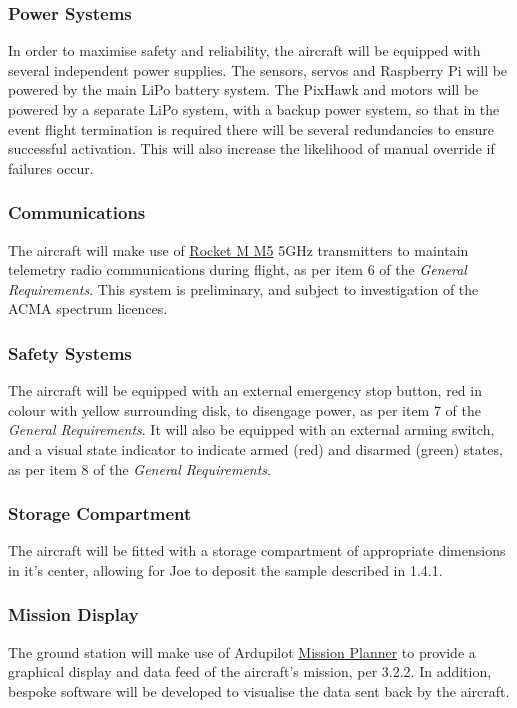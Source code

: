 \subsubsection*{Power Systems}
In order to maximise safety and reliability, the aircraft will be equipped with several independent power supplies. The sensors, servos and Raspberry Pi will be powered by the main LiPo battery system. The PixHawk and motors will be powered by a separate LiPo system, with a backup power system, so that in the event flight termination is required there will be several redundancies to ensure successful activation. This will also increase the likelihood of manual override if failures occur.

\subsubsection*{Communications}
The aircraft will make use of \href{https://www.ubnt.com/airmax/rocketm/}{Rocket M M5}  5GHz transmitters to maintain telemetry radio communications during flight, as per item 6 of the \textit{General Requirements}. This system is preliminary, and subject to investigation of the ACMA spectrum licences.

\subsubsection*{Safety Systems}
The aircraft will be equipped with an external emergency stop button, red in colour with yellow surrounding disk, to disengage power, as per item 7 of the \textit{General Requirements}. It will also be equipped with an external arming switch, and a visual state indicator to indicate armed (red) and disarmed (green) states, as per item 8 of the \textit{General Requirements}.

\subsubsection*{Storage Compartment}
The aircraft will be fitted with a storage compartment of appropriate dimensions in it's center, allowing for Joe to deposit the sample described in 1.4.1.

\subsubsection*{Mission Display}
The ground station will make use of Ardupilot \href{http://planner.ardupilot.com/}{Mission Planner} to provide a graphical display and data feed of the aircraft's mission, per 3.2.2. In addition, bespoke software will be developed to visualise the data sent back by the aircraft.
